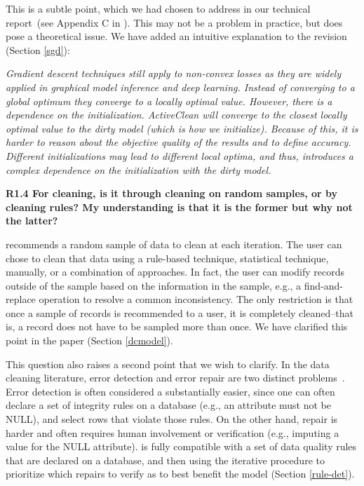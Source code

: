 \noindent This is a subtle point, which we had chosen to address in our technical report~(see Appendix C in \cite{activecleanarxiv}). This may not be a problem in practice, but does pose a theoretical issue. We have added an intuitive explanation to the revision (Section \ref{sgd}):

\emph{Gradient descent techniques still apply to non-convex losses as they are widely applied in graphical model inference and deep learning. Instead of converging to a global optimum
they converge to a locally optimal value. However, there is a dependence on the initialization.
ActiveClean will converge to the closest locally optimal value to
the dirty model (which is how we initialize). Because of this, it is harder to reason about
the objective quality of the results and to define accuracy.
 Different initializations may lead to different local
optima, and thus, introduces a complex dependence on the
initialization with the dirty model.}

\vspace{0.5em}

\noindent\textbf{R1.4 For cleaning, is it through cleaning on random samples, or by cleaning rules? My understanding is that it is the former but why not the latter?}

\noindent \sys recommends a random sample of data to clean at each iteration. 
The user can chose to clean that data using a rule-based technique, statistical technique, manually, or a combination of approaches.
In fact, the user can modify records outside of the sample based on the information in the sample, e.g., a find-and-replace operation to resolve a common inconsistency.
The only restriction is that once a sample of records is recommended to a user, it is completely cleaned--that is, a record does not have to be sampled more than once.
We have clarified this point in the paper (Section \ref{dcmodel}).

This question also raises a second point that we wish to clarify.
In the data cleaning literature, error detection and error repair are two distinct problems~\cite{DBLP:series/synthesis/2012Fan, Dasu:2003:EDM:861869, rahm2000data}.
Error detection is often considered a substantially easier, since one can often declare a set of integrity rules on a database (e.g., an attribute must not be NULL), and select rows that violate those rules.
On the other hand, repair is harder and often requires human involvement or verification (e.g., imputing a value for the NULL attribute).
\sys is fully compatible with a set of data quality rules that are declared on a database, and then using the iterative procedure to prioritize which repairs to verify as to best benefit the model (Section \ref{rule-det}).

